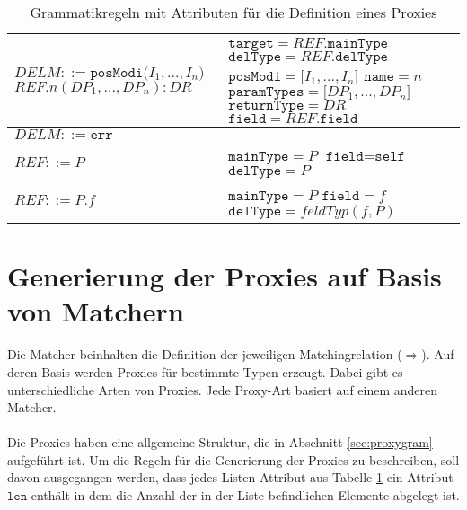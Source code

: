 \documentclass[a4paper,12pt]{article}
\begin{document}
\begin{table}[H]
\begin{tabular}{|p{6cm}|p{8cm}|}
\\
\hline
$\mathit{DELM} ::=\texttt{posModi(} \mathit{I_1},...,\mathit{I_n} \texttt{)}$\newline
$\mathit{REF}\texttt{.}n(\mathit{DP_1},...,\mathit{DP_n}):DR $  
&
$\texttt{target} = \mathit{REF}.\texttt{mainType}$\newline
$\texttt{delType} = \mathit{REF}.\texttt{delType}$\newline
$\texttt{posModi} = \mathit{[I_1},...,\mathit{I_n]}$\newline
$\texttt{name} = \mathit{n}$\newline
$\texttt{paramTypes} = \mathit{[DP_1},...,\mathit{DP_n]}$\newline
$\texttt{returnType} = \mathit{DR}$\newline
$\texttt{field} = \mathit{REF}\texttt{.field}$
\\
\hline
$\mathit{DELM} ::= \texttt{err} $  
&
\\
\hline
$\mathit{REF} ::= \mathit{P}$
& 
$\texttt{mainType} = \mathit{P}$\newline
$\texttt{field} = \texttt{self}$\newline
$\texttt{delType} = \mathit{P}$
\\
\hline
$\mathit{REF} ::= \mathit{P}\texttt{.}\mathit{f}$
&
$\texttt{mainType} = \mathit{P}$\newline
$\texttt{field} = \mathit{f}$\newline
$\texttt{delType} = \mathit{feldTyp(f,P)}$
\\
\hline
\end{tabular}
\caption{Grammatikregeln mit Attributen für die Definition eines Proxies}
 \label{tab:attrGrProxies}
\end{table}

\newpage
\section{Generierung der Proxies auf Basis von Matchern}
Die Matcher beinhalten die Definition der jeweiligen Matchingrelation ($\Rightarrow$). Auf deren Basis werden Proxies für bestimmte Typen erzeugt. Dabei gibt es unterschiedliche Arten von Proxies. Jede Proxy-Art basiert auf einem anderen Matcher.\\\\
Die Proxies haben eine allgemeine Struktur, die in Abschnitt \ref{sec:proxygram} aufgeführt ist. Um die Regeln für die Generierung der Proxies zu beschreiben, soll davon ausgegangen werden, dass jedes Listen-Attribut aus Tabelle \ref{tab:attrGrProxies} ein Attribut $\texttt{len}$ enthält in dem die Anzahl der in der Liste befindlichen Elemente abgelegt ist.
\end{document}
